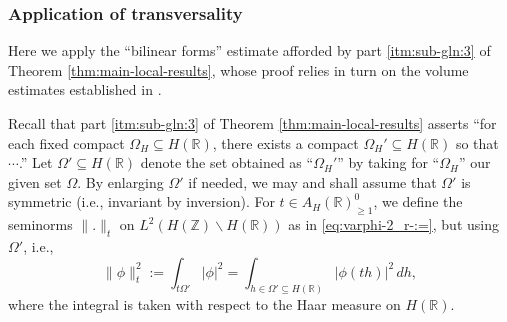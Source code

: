 \subsubsection{Application of transversality}
Here we apply the ``bilinear forms'' estimate afforded by part \eqref{itm:sub-gln:3} of Theorem \ref{thm:main-local-results}, whose proof relies in turn on the volume estimates established in \cite[\S15--16]{2020arXiv201202187N}.

Recall that part \eqref{itm:sub-gln:3} of Theorem \ref{thm:main-local-results} asserts ``for each fixed compact $\Omega_{H} \subseteq H(\mathbb{R})$, there exists a compact $\Omega_{H}' \subseteq H(\mathbb{R})$ so that $\dotsb$.''  Let $\Omega ' \subseteq H(\mathbb{R})$ denote the set obtained as ``$\Omega_{H}'$'' by taking for ``$\Omega_H$'' our given set $\Omega$.  By enlarging $\Omega '$ if needed, we may and shall assume that $\Omega '$ is symmetric (i.e., invariant by inversion).  For $t \in A_H(\mathbb{R})^0_{\geq 1}$, we define the seminorms $\|.\|_t$ on $L^2(H(\mathbb{Z}) \backslash H(\mathbb{R}))$ as in \eqref{eq:varphi-2_r-:=}, but using $\Omega '$, i.e.,
\begin{equation*}
  \|\phi\|^2_t := \int_{t \Omega' } |\phi|^2
  =
  \int_{h \in \Omega' \subseteq H(\mathbb{R})}
  |\phi(t h)|^2
  \, d h,
\end{equation*}
where the integral is taken with respect to the Haar measure on $H(\mathbb{R})$.

